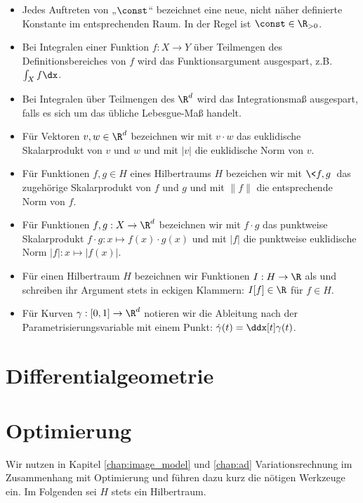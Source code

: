 \documentclass{mythesis}
\begin{document}
\begin{itemize}
    \item
	Jedes Auftreten von „$\const$“ bezeichnet eine neue, nicht näher definierte Konstante im entsprechenden Raum.
	In der Regel ist $\const \in \R_{>0}$.
    \item
	Bei Integralen einer Funktion $f: X \to Y$ über Teilmengen des Definitionsbereiches von $f$ wird das Funktionsargument ausgespart, z.B. $\int_X f \dx$.
    \item
	Bei Integralen über Teilmengen des $\R^d$ wird das Integrationsmaß ausgespart, falls es sich um das übliche Lebesgue-Maß handelt.
    \item
	Für Vektoren $v, w \in \R^d$ bezeichnen wir mit $v \cdot w$ das euklidische Skalarprodukt von $v$ und $w$ und mit $|v|$ die euklidische Norm von $v$.
    \item
	Für Funktionen $f, g \in H$ eines Hilbertraums $H$ bezeichen wir mit $\<f, g\>$ das zugehörige Skalarprodukt von $f$ und $g$ und mit $\|f\|$ die entsprechende Norm von $f$.
    \item
	Für Funktionen $f, g: X \to \R^d$ bezeichnen wir mit $f \cdot g$ das punktweise Skalarprodukt $f \cdot g: x \mapsto f(x)\cdot g(x)$ und mit $|f|$ die punktweise euklidische Norm $|f|: x \mapsto |f(x)|$.
    \item
	Für einen Hilbertraum $H$ bezeichnen wir Funktionen $I: H \to \R$ als  und schreiben ihr Argument stets in eckigen Klammern: $I[f] \in \R$ für $f \in H$.
    \item
	Für Kurven $\gamma: [0,1] \to \R^d$ notieren wir die Ableitung nach der Parametrisierungsvariable mit einem Punkt: $\dot \gamma(t) = \ddx[t] \gamma(t)$.
\end{itemize}


\section*{Differentialgeometrie}


\section*{Optimierung}

Wir nutzen in Kapitel \ref{chap:image_model} und \ref{chap:ad} Variationsrechnung im Zusammenhang mit Optimierung und führen dazu kurz die nötigen Werkzeuge ein.
Im Folgenden sei $H$ stets ein Hilbertraum.
\end{document}

